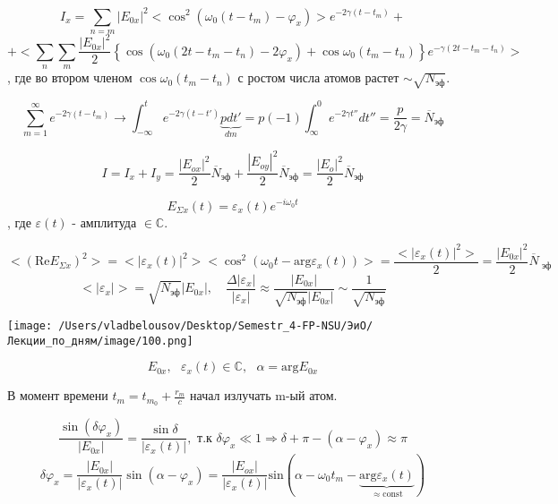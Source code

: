 \documentclass[12pt, a4paper]{report}
\begin{document}
\[ I_x = \sum_{n =m } |E_{0x}  | ^2 <\cos  ^2 (\omega_0 (t -t_m ) - \varphi_x )> e^{-2 \gamma (t -t_m )} +   \] 
\[ + \bigg< \sum_{n}\sum_{m} \frac{ |E_{0x } | ^2 }{2 }\left\{ \cos (\omega_0 (2t - t_m -t_n ) - 2 \varphi_x) + \cos \omega_0 (t_m - t_n) \right\} e^{-\gamma (2t - t_m - t_n)}\bigg> \] 
, где во втором членом \(\cos \omega_0 (t_m - t_n)   \) с ростом числа атомов растет \( \sim \sqrt{N_{\text{эф} } } \).

\[ \sum_{m =1}^{\infty  }e^{- 2 \gamma (t - t_m )} \to  \int_{- \infty  }^{t } e^{-2 \gamma (t - t' ) }  \underbrace{p dt '}_{dm } = p (- 1 ) \int_{\infty }^{0} e^{- 2\gamma t''     } dt '' = \frac{p }{2\gamma } = \overline{N }_{\text{эф} }         \] 

\[ I = I_x + I_y     = \frac{|E_{ox }  | ^2 }{2}\overline{N }_{\text{эф} } +\frac{|E_{oy }  | ^2 }{2} \overline{N }_{\text{эф} } = \frac{|E_{o }  | ^2 }{2} \overline{N }_{\text{эф} } \] 

\[ E_{\Sigma x } (t ) = \varepsilon_x(t ) e^{ - i \omega_0 t }   \] 
, где \( \varepsilon(t ) \) - амплитуда \( \in \mathbb{C} \).

\[ <(\mathrm{Re }  E_{\Sigma x }      ) ^2 > = <|\varepsilon_{x} (t)| ^2 ><\cos  ^2 (\omega_0 t - \mathrm{arg }  \varepsilon _x (t ) )> = \frac{ <|\varepsilon_x (t)| ^2 >}{2 } = \frac{|E_{0x} | ^2 }{2} \overline{N } _{\text{ эф} }   \] 
\[ <|\varepsilon_x |> = \sqrt{N_{\text{эф} } } |E_{0x } | , \quad  \frac{ \Delta |\varepsilon_{x} |}{|\varepsilon_x|} \approx \frac{|E_{0x} |}{\sqrt{N_{\text{эф} } }|E_{0x} |}  \sim \frac{1}{\sqrt{N_{\text{эф} } }}  \] 

\begin{center}
    \texttt{[image: /Users/vladbelousov/Desktop/Semestr\_4-FP-NSU/ЭиО/Лекции\_по\_дням/image/100.png]}
\end{center} 
\[ E_{0x}, \text{ }  \varepsilon_x (t ) \in \mathbb{C}  , \text{ } \alpha  = \mathrm{arg }  E_{0x}    \] 

В момент времени \( t_m = t_{m_0} + \frac{ r_m }{c}   \) начал излучать m-ый атом.

\[ \frac{\sin (\delta \varphi_x ) }{|E_{0x} |} =\frac{\sin \delta}{|\varepsilon_x(t)|}, \text{ т.к } \delta \varphi_x \ll 1 \Rightarrow \delta + \pi - (\alpha - \varphi_x ) \approx \pi    \] 
\[ \delta \varphi_x = \frac{ |E_{0x} |}{|\varepsilon_x(t)|} \sin (\alpha - \varphi_x ) = \frac{|E_{ox } |}{|\varepsilon_x(t     )|} \mathrm{ sin }    (\alpha - \omega_0 t_m - \underbrace{\mathrm{arg } \varepsilon_{x } (t )}_{\approx \mathrm{const}  }  )   \] 
\end{document}
